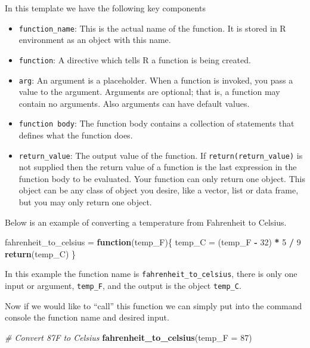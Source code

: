\documentclass[
]{book}
\newenvironment{Shaded}{\begin{snugshade}}{\end{snugshade}}
\newcommand{\CommentTok}[1]{\textcolor[rgb]{0.56,0.35,0.01}{\textit{#1}}}
\newcommand{\ControlFlowTok}[1]{\textcolor[rgb]{0.13,0.29,0.53}{\textbf{#1}}}
\newcommand{\DataTypeTok}[1]{\textcolor[rgb]{0.13,0.29,0.53}{#1}}
\newcommand{\DecValTok}[1]{\textcolor[rgb]{0.00,0.00,0.81}{#1}}
\newcommand{\KeywordTok}[1]{\textcolor[rgb]{0.13,0.29,0.53}{\textbf{#1}}}
\newcommand{\NormalTok}[1]{#1}
\newcommand{\OperatorTok}[1]{\textcolor[rgb]{0.81,0.36,0.00}{\textbf{#1}}}
\newcommand{\StringTok}[1]{\textcolor[rgb]{0.31,0.60,0.02}{#1}}
\providecommand{\tightlist}{%
  \setlength{\itemsep}{0pt}\setlength{\parskip}{0pt}}
\begin{document}
In this template we have the following key components

\begin{itemize}
\tightlist
\item
  \texttt{function\_name}: This is the actual name of the function. It is stored in R environment as an object with this name.
\item
  \texttt{function}: A directive which tells R a function is being created.
\item
  \texttt{arg}: An argument is a placeholder. When a function is invoked, you pass a value to the argument. Arguments are optional; that is, a function may contain no arguments. Also arguments can have default values.
\item
  \texttt{function\ body}: The function body contains a collection of statements that defines what the function does.
\item
  \texttt{return\_value}: The output value of the function. If \texttt{return(return\_value)} is not supplied then the return value of a function is the last expression in the function body to be evaluated. Your function can only return one object. This object can be any class of object you desire, like a vector, list or data frame, but you may only return one object.
\end{itemize}

Below is an example of converting a temperature from Fahrenheit to Celsius.

\begin{Shaded}
\begin{Highlighting}[]
\NormalTok{fahrenheit_to_celsius =}\StringTok{ }\ControlFlowTok{function}\NormalTok{(temp_F)\{}
\NormalTok{  temp_C =}\StringTok{ }\NormalTok{(temp_F }\OperatorTok{-}\StringTok{ }\DecValTok{32}\NormalTok{) }\OperatorTok{*}\StringTok{ }\DecValTok{5} \OperatorTok{/}\StringTok{ }\DecValTok{9}
  \KeywordTok{return}\NormalTok{(temp_C)}
\NormalTok{\}}
\end{Highlighting}
\end{Shaded}

In this example the function name is \texttt{fahrenheit\_to\_celsius}, there is only one input or argument, \texttt{temp\_F}, and the output is the object \texttt{temp\_C}.

Now if we would like to ``call'' this function we can simply put into the command console the function name and desired input.

\begin{Shaded}
\begin{Highlighting}[]
\CommentTok{# Convert 87F to Celsius}
\KeywordTok{fahrenheit_to_celsius}\NormalTok{(}\DataTypeTok{temp_F =} \DecValTok{87}\NormalTok{)}
\end{Highlighting}
\end{Shaded}
\end{document}
